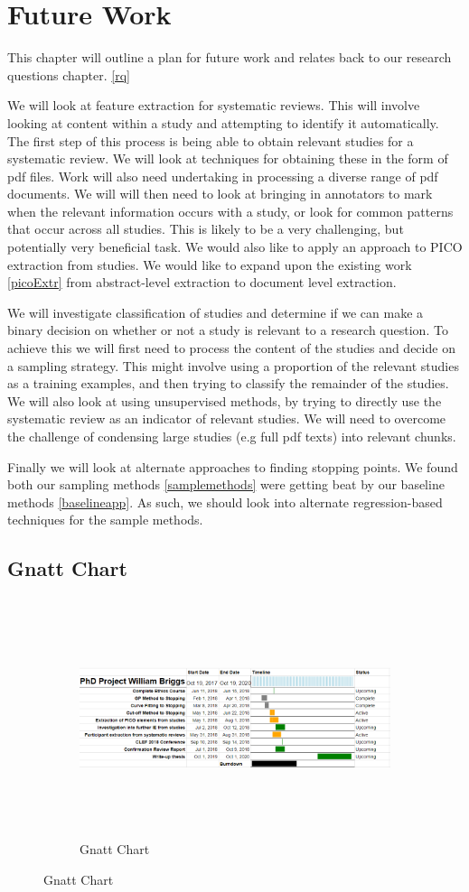\chapter{Future Work} \label{fw}

This chapter will outline a plan for future work and relates back to our research questions chapter. \ref{rq}

We will look at feature extraction for systematic reviews. This will involve looking at content within a study and attempting to identify it automatically. The first step of this process is being able to obtain relevant studies for a systematic review. We will look at techniques for obtaining these in the form of pdf files. Work will also need undertaking in processing a diverse range of pdf documents. We will will then need to look at bringing in annotators to mark when the relevant information occurs with a study, or look for common patterns that occur across all studies. This is likely to be a very challenging, but potentially very beneficial task. We would also like to apply an approach to PICO extraction from studies. We would like to expand upon the existing work \ref{picoExtr} from abstract-level extraction to document level extraction.


We will investigate classification of studies and determine if we can make a binary decision on whether or not a study is relevant to a research question. To achieve this we will first need to process the content of the studies and decide on a sampling strategy. This might involve using a proportion of the relevant studies as a training examples, and then trying to classify the remainder of the studies. We will also look at using unsupervised methods, by trying to directly use the systematic review as an indicator of relevant studies. We will need to overcome the challenge of condensing large studies (e.g full pdf texts) into relevant chunks.


Finally we will look at alternate approaches to finding stopping points. We found both our sampling methods \ref{samplemethods} were getting beat by our baseline methods \ref{baselineapp}. As such, we should look into alternate regression-based techniques for the sample methods.

\section{Gnatt Chart}

\begin{figure}


\begin{figure}[H]
\center
\includegraphics[height=7cm]{figures/gnatt.png}
\caption{Gnatt Chart}
\end{figure}
\end{figure}


